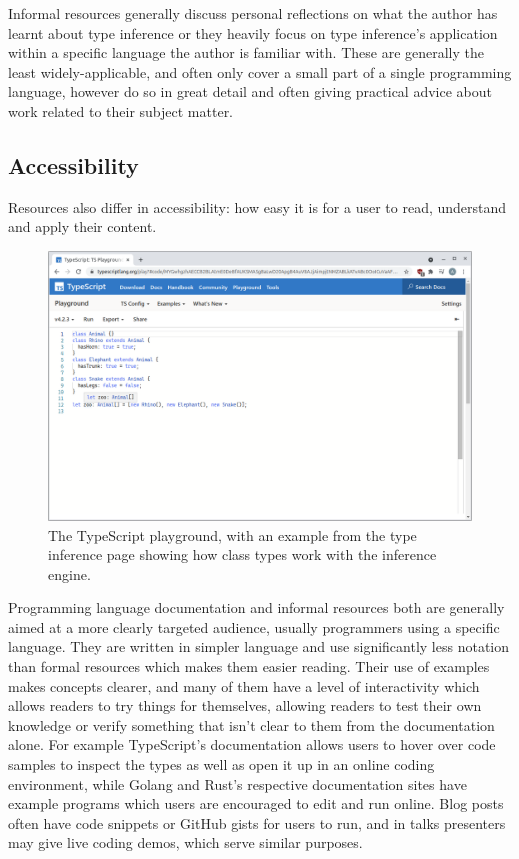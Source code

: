 \documentclass[a4paper,fleqn,oneside,12pt]{report}
\begin{document}
Informal resources generally discuss personal reflections on what the author has learnt about type inference or they heavily focus on type inference's application within a specific language the author is familiar with. These are generally the least widely-applicable, and often only cover a small part of a single programming language, however do so in great detail and often giving practical advice about work related to their subject matter.

\subsection{Accessibility}

Resources also differ in accessibility: how easy it is for a user to read, understand and apply their content.

\begin{figure}[h!]
  \centering
  \includegraphics[width=\linewidth]{images/image8.png}
  \caption{The TypeScript playground, with an example from the type inference page showing how class types work with the inference engine.}
\end{figure}

Programming language documentation and informal resources both are generally aimed at a more clearly targeted audience, usually programmers using a specific language. They are written in simpler language and use significantly less notation than formal resources which makes them easier reading. Their use of examples makes concepts clearer, and many of them have a level of interactivity which allows readers to try things for themselves, allowing readers to test their own knowledge or verify something that isn’t clear to them from the documentation alone. For example TypeScript's documentation allows users to hover over code samples to inspect the types as well as open it up in an online coding environment, while Golang and Rust's respective documentation sites have example programs which users are encouraged to edit and run online. Blog posts often have code snippets or GitHub gists for users to run, and in talks presenters may give live coding demos, which serve similar purposes.
\end{document}
